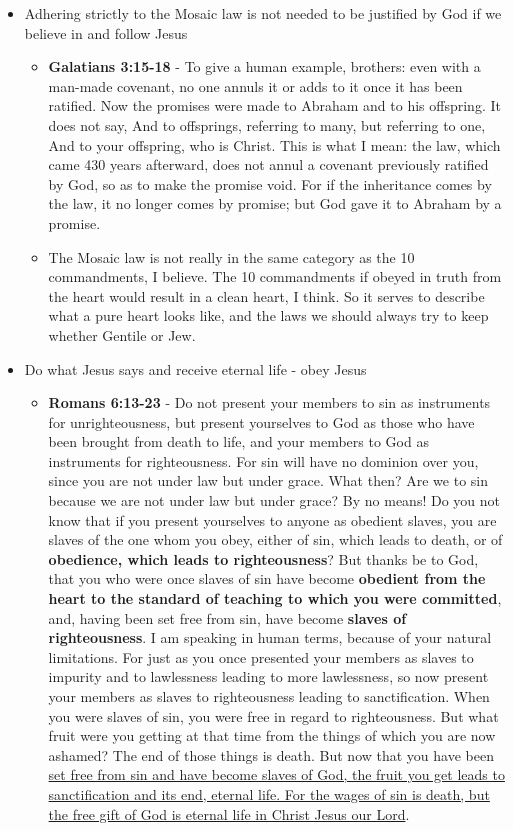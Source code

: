 \documentclass[11pt]{article}
\begin{document}
\begin{itemize}
\begin{itemize}
\end{itemize}
\item Adhering strictly to the Mosaic law is not needed to be justified by God if we believe in and follow Jesus
\begin{itemize}
\item \textbf{Galatians 3:15-18} - To give a human example, brothers: even with a man-made covenant, no one annuls it or adds to it once it has been ratified. Now the promises were made to Abraham and to his offspring. It does not say, And to offsprings, referring to many, but referring to one, And to your offspring, who is Christ. This is what I mean: the law, which came 430 years afterward, does not annul a covenant previously ratified by God, so as to make the promise void. For if the inheritance comes by the law, it no longer comes by promise; but God gave it to Abraham by a promise.
\item The Mosaic law is not really in the same category as the 10 commandments, I believe. The 10 commandments if obeyed in truth from the heart would result in a clean heart, I think. So it serves to describe what a pure heart looks like, and the laws we should always try to keep whether Gentile or Jew.
\end{itemize}
\item Do what Jesus says and receive eternal life - obey Jesus
\begin{itemize}
\item \textbf{Romans 6:13-23} - Do not present your members to sin as instruments for unrighteousness, but present yourselves to God as those who have been brought from death to life, and your members to God as instruments for righteousness.  For sin will have no dominion over you, since you are not under law but under grace.  What then? Are we to sin because we are not under law but under grace? By no means!  Do you not know that if you present yourselves to anyone as obedient slaves, you are slaves of the one whom you obey, either of sin, which leads to death, or of \textbf{obedience, which leads to righteousness}?  But thanks be to God, that you who were once slaves of sin have become \textbf{obedient from the heart to the standard of teaching to which you were committed}, and, having been set free from sin, have become \textbf{slaves of righteousness}.  I am speaking in human terms, because of your natural limitations. For just as you once presented your members as slaves to impurity and to lawlessness leading to more lawlessness, so now present your members as slaves to righteousness leading to sanctification.  When you were slaves of sin, you were free in regard to righteousness.  But what fruit were you getting at that time from the things of which you are now ashamed? The end of those things is death.  But now that you have been \uline{set free from sin and have become slaves of God, the fruit you get leads to sanctification and its end, eternal life.  For the wages of sin is death, but the free gift of God is eternal life in Christ Jesus our Lord}.

\end{itemize}
\end{itemize}
\end{document}
